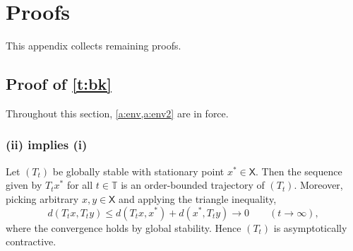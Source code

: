 \documentclass[12pt,reqno]{amsart}
\numberwithin{equation}{section}
\theoremstyle{definition}
\newcommand{\1}{\mathbbm{1}}
\newcommand{\TT}{\mathbb T}
\newcommand{\Xsf}{\mathsf{X}}
\newcommand{\lam}{\lambda}
\begin{document}
%
%
%

\appendix

\section{Proofs}\label{s:proofs}

This appendix collects remaining proofs.

\subsection{Proof of \texorpdfstring{\cref{t:bk}}{Theorem \ref{t:bk}}}

Throughout this section, \cref{a:env,a:env2} are in force.

\subsubsection{(ii) implies (i)}

Let $(T_t)$ be globally stable with stationary point $x^* \in
\Xsf$.  Then the sequence given by $T_t x^{*}$ for all $t \in \TT$ is an
order-bounded trajectory of $(T_t)$.  Moreover, picking arbitrary $x, y \in \Xsf$
and applying the triangle inequality,
%
\begin{equation*}
    d(T_t x, T_t y) \leq d(T_t x, x^*) + d(x^*, T_t y) \rightarrow 0
    \qquad (t \to \infty),
\end{equation*}
%
where the convergence holds by global stability.  Hence $(T_t)$ is
asymptotically contractive.
\end{document}
